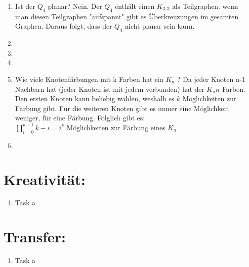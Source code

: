 \begin{enumerate}[label=(\alph*)]
        \item Ist der $Q_4$ planar?
        Nein. Der $Q_4$ enthält einen $K_{3,3}$ als Teilgraphen. wenn man diesen Teilgraphen "aufspannt" gibt es Überkreuzungen im gesamten Graphen. Daraus folgt, dass der $Q_4$ nicht planar sein kann.
        \item
        
        \item
        
        \item
        \item Wie viele Knotenfärbungen mit k Farben hat ein $K_n$ ?
        Da jeder Knoten n-1 Nachbarn hat (jeder Knoten ist mit jedem verbunden) hat der $K_n n$ Farben. Den ersten Knoten kann beliebig wählen, weshalb es $k$ Möglichkeiten zur Färbung gibt. Für die weiteren Knoten gibt es immer eine Möglichkeit weniger, für eine Färbung. Folglich gibt es: \\
        $\prod_{i=0}^{k-1} k - i = i^k $ Möglichkeiten zur Färbung eines $K_n$
          
        \item
        
    \end{enumerate}
    \section*{Kreativität:}
    \begin{enumerate}[label=(\alph*)]
    	\item Task a
    \end{enumerate}
    \section*{Transfer:}
    \begin{enumerate}[label=(\alph*)]
    	\item Task a
    \end{enumerate}







